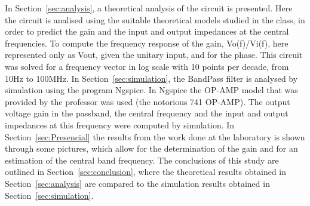 In Section~\ref{sec:analysis}, a theoretical analysis of the circuit is
presented. Here the circuit is analised using the suitable theoretical models studied in the class, in order to predict the gain and the input and output impedances at the central frequencies. To compute the frequency response of the gain, Vo(f)/Vi(f), here represented only as Vout, given the unitary input, and for the phase. This circuit was solved for a frequency vector in log scale with 10 points per decade, from 10Hz to 100MHz. 
In Section~\ref{sec:simulation}, the BandPass filter is analysed by
simulation using the program Ngspice. In Ngspice the OP-AMP model that was provided by the professor was used (the notorious 741 OP-AMP). The output voltage gain in the passband, the central frequency and the input and output impedances at this frequency were computed by simulation. 
In Section~\ref{sec:Presencial} the results from the work done at the laboratory is shown through some pictures, which allow for the determination of the gain and for an estimation of the central band frequency. The conclusions of this study are outlined in Section~\ref{sec:conclusion}, where the theoretical results obtained in Section~\ref{sec:analysis} are compared to the simulation results obtained in Section~\ref{sec:simulation}.





\pagebreak

